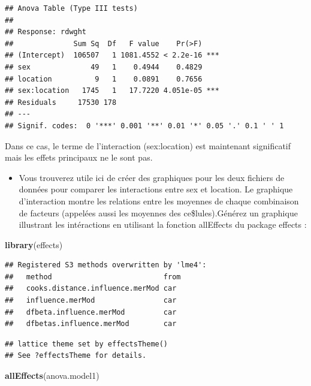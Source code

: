 \documentclass[12pt,]{book}
\newenvironment{Shaded}{\begin{snugshade}}{\end{snugshade}}
\newcommand{\KeywordTok}[1]{\textcolor[rgb]{0.27,0.27,0.27}{\textbf{#1}}}
\newcommand{\NormalTok}[1]{#1}
\providecommand{\tightlist}{%
  \setlength{\itemsep}{0pt}\setlength{\parskip}{0pt}}
\begin{document}
\begin{verbatim}
## Anova Table (Type III tests)
## 
## Response: rdwght
##              Sum Sq  Df   F value    Pr(>F)    
## (Intercept)  106507   1 1081.4552 < 2.2e-16 ***
## sex              49   1    0.4944    0.4829    
## location          9   1    0.0891    0.7656    
## sex:location   1745   1   17.7220 4.051e-05 ***
## Residuals     17530 178                        
## ---
## Signif. codes:  0 '***' 0.001 '**' 0.01 '*' 0.05 '.' 0.1 ' ' 1
\end{verbatim}

Dans ce cas, le terme de l'interaction (sex:location) est maintenant significatif mais les effets principaux ne le sont pas.

\begin{itemize}
\tightlist
\item
  Vous trouverez utile ici de créer des graphiques pour les deux fichiers de données pour comparer les interactions entre sex et location. Le graphique d'interaction montre les relations entre les moyennes de chaque combinaison de facteurs (appelées aussi les moyennes des ce\$lules).Générez un graphique illustrant les intéractions en utilisant la fonction allEffects du package effects :
\end{itemize}

\begin{Shaded}
\begin{Highlighting}[]
\KeywordTok{library}\NormalTok{(effects)}
\end{Highlighting}
\end{Shaded}

\begin{verbatim}
## Registered S3 methods overwritten by 'lme4':
##   method                          from
##   cooks.distance.influence.merMod car 
##   influence.merMod                car 
##   dfbeta.influence.merMod         car 
##   dfbetas.influence.merMod        car
\end{verbatim}

\begin{verbatim}
## lattice theme set by effectsTheme()
## See ?effectsTheme for details.
\end{verbatim}

\begin{Shaded}
\begin{Highlighting}[]
\KeywordTok{allEffects}\NormalTok{(anova.model1)}
\end{Highlighting}
\end{Shaded}
\end{document}
